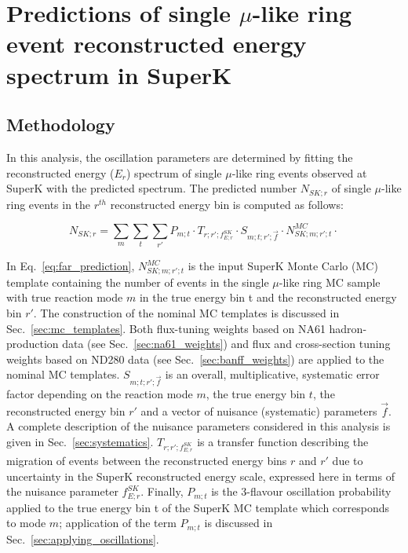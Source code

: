 \clearpage

\section {Predictions of single $\mu$-like ring event reconstructed energy spectrum in SuperK}
\label{sec:spectrum_prediction}

\subsection {Methodology}

In this analysis, 
the oscillation parameters are determined 
by fitting the reconstructed energy ($E_{r}$) spectrum
of single $\mu$-like ring events observed at SuperK with the predicted spectrum.
The predicted number $N_{SK;r}$ 
of single $\mu$-like ring events in the $r^{th}$ reconstructed energy bin
is computed as follows:

\begin{equation}
\displaystyle
  N_{SK;r} = 
    \sum_{m} \sum_{t} \sum_{r\prime}
        P_{m;t} \cdot
        T_{r;r\prime;f_{E; r}^{SK}} \cdot
        S_{m;t;r\prime;\vec{f}} \cdot
        N_{SK;m;r\prime;t}^{MC} \cdot
\label{eq:far_prediction}
\end{equation}

In Eq.~\ref{eq:far_prediction}, $N_{SK;m;r\prime;t}^{MC}$ is the input SuperK Monte Carlo (MC) template 
containing the number of events in the single $\mu$-like ring MC sample with true reaction mode $m$ in the 
true energy bin t and the reconstructed energy bin $r\prime$.
The construction of the nominal MC templates is discussed in Sec.~\ref{sec:mc_templates}.
Both flux-tuning weights based on NA61 hadron-production data (see Sec.~\ref{sec:na61_weights})
and flux and cross-section tuning weights based on ND280 data (see Sec.~\ref{sec:banff_weights})
are applied to the nominal MC templates.
$S_{m;t;r\prime;\vec{f}}$ is an overall, multiplicative, systematic error factor 
depending on the reaction mode $m$, the true energy bin $t$, the reconstructed energy bin $r\prime$ 
and a vector of nuisance (systematic) parameters $\vec{f}$. 
A complete description of the nuisance parameters considered in this analysis is given in Sec.~\ref{sec:systematics}.
$T_{r;r\prime;f_{E; r}^{SK}}$ is a transfer function describing the migration of events
between the reconstructed energy bins $r$ and $r\prime$ due to uncertainty in the SuperK reconstructed energy
scale, expressed here in terms of the nuisance parameter $f_{E; r}^{SK}$.
Finally, $P_{m;t}$ is the 3-flavour oscillation probability applied to the true energy
bin t of the SuperK MC template which corresponds to mode $m$;
application of the term $P_{m;t}$ is discussed in Sec.~\ref{sec:applying_oscillations}.

